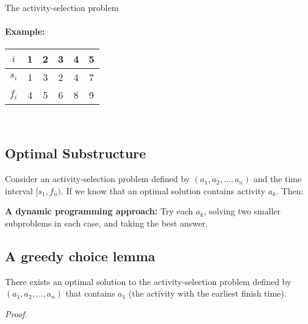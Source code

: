 \documentclass[11  pt]{article}
\begin{document}
\begin{center}
\end{center}

The activity-selection problem %

\paragraph{Example:}

{\Large
	\begin{tabular}{c | c | c | c | c |  c |}
		$i$ & 1 & 2 & 3 & 4 & 5 \\
		\hline
		$s_i$ & 1 & 3 & 2 & 4 & 7 \\
		\hline
		$f_i$ & 4 & 5 & 6&  8& 9
	\end{tabular} \\
}
\newpage




\subsection{Optimal Substructure}
Consider an activity-selection problem defined by $(a_1, a_2, \hdots , a_n)$ and the time interval $[s_1, f_n)$. If we know that an optimal solution contains activity $a_k$. Then:\\


\vs{8cm}


\textbf{A dynamic programming approach:}
Try each $a_k$, solving two smaller subproblems in each case, and taking the best answer. \\


\newpage


\subsection{A greedy choice lemma}
\begin{lemma}
	There exists an optimal solution to the activity-selection problem defined by $(a_1, a_2, \hdots , a_n)$ that contains $a_1$ (the activity with the earliest finish time).
\end{lemma}
\textit{Proof.}
\end{document}
